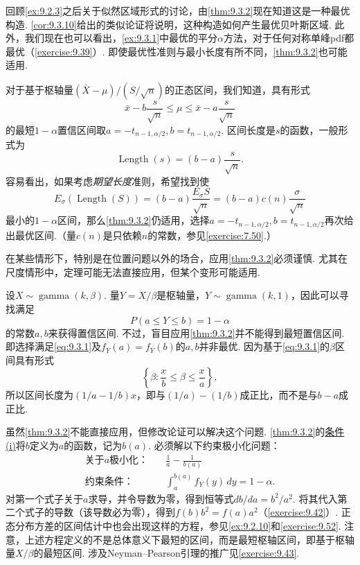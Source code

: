 回顾\autoref{ex:9.2.3}之后关于似然区域形式的讨论，由\autoref{thm:9.3.2}现在知道这是一种最优构造. \autoref{cor:9.3.10}给出的类似论证将说明，这种构造如何产生最优贝叶斯区域. 此外，我们现在也可以看出，\autoref{ex:9.3.1}中最优的平分$\alpha$方法，对于任何对称单峰pdf都最优（\autoref{exercise:9.39}）. 即使最优性准则与最小长度有所不同，\autoref{thm:9.3.2}也可能适用.
\begin{example}[期望长度的优化]\label{ex:9.3.3}
对于基于枢轴量$(\bar X-\mu)/(S/\sqrt n)$的正态区间，我们知道，具有形式
$$\bar x-b\frac s{\sqrt n}\le\mu\le\bar x-a\frac s{\sqrt n}$$
的最短$1-\alpha$置信区间取$a=-t_{n-1,\alpha/2},b=t_{n-1,\alpha/2}$. 区间长度是$s$的函数，一般形式为
$$\operatorname{Length}(s)=(b-a)\frac s{\sqrt n}.$$
容易看出，如果考虑\emph{期望长度}准则，希望找到使
$$E_\sigma(\operatorname{Length}(S))=(b-a)\frac{E_\sigma S}{\sqrt n}=(b-a)c(n)\frac\sigma{\sqrt n}$$
最小的$1-\alpha$区间，那么\autoref{thm:9.3.2}仍适用，选择$a=-t_{n-1,\alpha/2},b=t_{n-1,\alpha/2}$再次给出最优区间.（量$c(n)$是只依赖$n$的常数，参见\autoref{exercise:7.50}.）
\end{example}
在某些情形下，特别是在位置问题以外的场合，应用\autoref{thm:9.3.2}必须谨慎. 尤其在尺度情形中，定理可能无法直接应用，但某个变形可能适用.
\begin{example}[最短枢轴区间]\label{ex:9.3.4}
设$X\sim\operatorname{gamma}(k,\beta)$. 量$Y=X/\beta$是枢轴量，$Y\sim\operatorname{gamma}(k,1)$，因此可以寻找满足
\begin{equation}\label{eq:9.3.1}P(a\le Y\le b)=1-\alpha\end{equation}
的常数$a,b$来获得置信区间. 不过，盲目应用\autoref{thm:9.3.2}并不能得到最短置信区间. 即选择满足\eqref{eq:9.3.1}及$f_Y(a)=f_Y(b)$的$a,b$并非最优. 因为基于\eqref{eq:9.3.1}的$\beta$区间具有形式
$$\left\{\beta:\frac xb\le\beta\le\frac xa\right\},$$
所以区间长度为$(1/a-1/b)x$，即与$(1/a)-(1/b)$成正比，而不是与$b-a$成正比.

虽然\autoref{thm:9.3.2}不能直接应用，但修改论证可以解决这个问题. \autoref{thm:9.3.2}的\hyperref[item:9.3.2.i]{条件(i)}将$b$定义为$a$的函数，记为$b(a)$. 必须解以下约束极小化问题：
$$\begin{aligned}
\text{关于$a$极小化：}\quad&\frac1a-\frac1{b(a)}\\
\text{约束条件：}\quad&\int_a^{b(a)}f_Y(y)\,dy=1-\alpha.
\end{aligned}$$
对第一个式子关于$a$求导，并令导数为零，得到恒等式$db/da=b^2/a^2$. 将其代入第二个式子的导数（该导数必为零），得到$f(b)b^2=f(a)a^2$（\autoref{exercise:9.42}）. 正态分布方差的区间估计中也会出现这样的方程，参见\autoref{ex:9.2.10}和\autoref{exercise:9.52}. 注意，上述方程定义的不是总体意义下最短的区间，而是最短枢轴区间，即基于枢轴量$X/\beta$的最短区间. 涉及Neyman--Pearson引理的推广见\autoref{exercise:9.43}.
\end{example}
